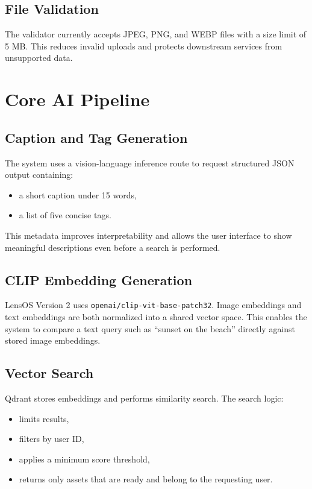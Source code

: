 \documentclass[12pt,a4paper]{report}
\begin{document}
\subsection{File Validation}
The validator currently accepts JPEG, PNG, and WEBP files with a size limit of 5 MB. This reduces invalid uploads and protects downstream services from unsupported data.

\section{Core AI Pipeline}
\subsection{Caption and Tag Generation}
The system uses a vision-language inference route to request structured JSON output containing:
\begin{itemize}[leftmargin=*]
    \item a short caption under 15 words,
    \item a list of five concise tags.
\end{itemize}
This metadata improves interpretability and allows the user interface to show meaningful descriptions even before a search is performed.

\subsection{CLIP Embedding Generation}
LensOS Version 2 uses \texttt{openai/clip-vit-base-patch32}. Image embeddings and text embeddings are both normalized into a shared vector space. This enables the system to compare a text query such as ``sunset on the beach'' directly against stored image embeddings.

\subsection{Vector Search}
Qdrant stores embeddings and performs similarity search. The search logic:
\begin{itemize}[leftmargin=*]
    \item limits results,
    \item filters by user ID,
    \item applies a minimum score threshold,
    \item returns only assets that are ready and belong to the requesting user.
\end{itemize}
\end{document}
